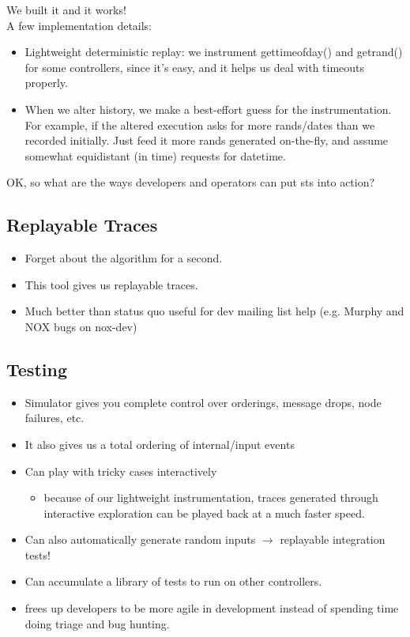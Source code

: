 We built it and it works! \\

A few implementation details:
\begin{itemize}
\item Lightweight deterministic replay: we instrument gettimeofday() and getrand() for some controllers, since it's easy, and it helps us deal with timeouts properly.
\item When we alter history, we make a best-effort guess for the
instrumentation. For example, if the altered execution asks for more rands/dates than we recorded initially. Just feed it more rands generated on-the-fly, and assume somewhat equidistant (in time) requests for datetime.
\end{itemize}

OK, so what are the ways developers and operators can put sts into action?

\subsection{Replayable Traces}
\begin{itemize}
\item Forget about the algorithm for a second.
\item This tool gives us replayable traces.
\item Much better than status quo useful for dev mailing list help (e.g. Murphy and NOX bugs on nox-dev)
\end{itemize}

\subsection{Testing}
\begin{itemize}
\item Simulator gives you complete control over orderings, message drops, node failures, etc.
\item It also gives us a total ordering of internal/input events
\item Can play with tricky cases interactively
  \begin{itemize}
  \item because of our lightweight instrumentation, traces generated through interactive exploration can be played back at a much faster speed.
  \end{itemize}

\item Can also automatically generate random inputs $\rightarrow$ replayable integration tests!
\item Can accumulate a library of tests to run on other controllers.
\item frees up developers to be more agile in development instead of spending time doing triage and bug hunting.
\end{itemize}

